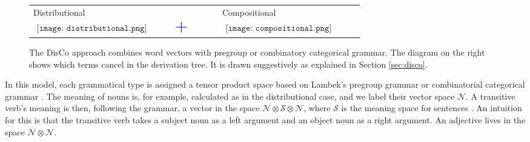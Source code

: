 \begin{figure}[ht]
\label{fig:discofig}
\begin{center}
\begin{tabular}{m{0.3\linewidth}@{}m{0.1\linewidth}@{}m{0.3\linewidth}}
 Distributional & & Compositional \\
 $\begin{aligned}
 \texttt{[image: distributional.png]}
 \end{aligned}$
 & $\begin{aligned}\mbox{{\color{blue} \huge +}}\end{aligned}$ & 
  $\begin{aligned}
 \texttt{[image: compositional.png]}
 \end{aligned}$
\end{tabular}
\end{center}
\caption{The DisCo approach combines word vectors with pregroup or combinatory categorical grammar. The diagram on the right shows which terms cancel in the derivation tree.  It is drawn suggestively as explained in Section \ref{sec:disco}. }
\end{figure}

In this model, each grammatical type is assigned a tensor product space based on Lambek's pregroup grammar \cite{lambek2008word} or combinatorial categorical grammar \cite{hermann2013role}. The meaning of nouns is, for example, calculated as in the distributional case, and we label their vector space $\mathcal{N}$.  A transitive verb's meaning is then, following the grammar, a vector in the space $\mathcal{N}\otimes \mathcal{S} \otimes \mathcal{N}$, where $\mathcal{S}$ is the meaning space for sentences \cite{clark2008compositional}. An intuition for this is that the transitive verb takes a subject noun as a left argument and an object noun as a right argument. An adjective lives in the space $\mathcal{N}\otimes\mathcal{N}$.

